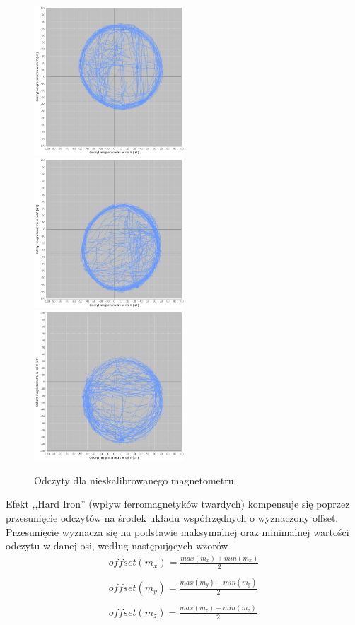 \begin{figure}[h!]
    \centering
    \includegraphics[width=0.5\textwidth]{Rysunki/Rozdzial03/Magnetometr_nieskalibrowany_XY.png}
    \includegraphics[width=0.5\textwidth]{Rysunki/Rozdzial03/Magnetometr_nieskalibrowany_XZ.png}
    \includegraphics[width=0.5\textwidth]{Rysunki/Rozdzial03/Magnetometr_nieskalibrowany_YZ.png}
    \caption{Odczyty dla nieskalibrowanego magnetometru}
    \label{Magnetometr nieskalibrowany}
\end{figure}

Efekt ,,Hard Iron'' (wpływ ferromagnetyków twardych) kompensuje się poprzez przesunięcie odczytów na środek układu współrzędnych o wyznaczony offset. Przesunięcie wyznacza się na podstawie maksymalnej oraz minimalnej wartości odczytu w danej osi, według następujących wzorów
$$
    \begin{array}{c}
        offset(m_x) = \frac{max(m_x) + min(m_x)}{2} \\ \\
        offset(m_y) = \frac{max(m_y) + min(m_y)}{2} \\ \\
        offset(m_z) = \frac{max(m_z) + min(m_z)}{2}
    \end{array}
$$

